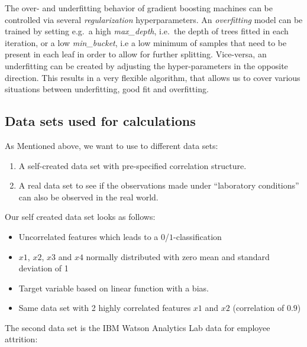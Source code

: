 \documentclass[]{krantz}
\providecommand{\tightlist}{%
  \setlength{\itemsep}{0pt}\setlength{\parskip}{0pt}}
\begin{document}
The over- and underfitting behavior of gradient boosting machines can be
controlled via several \emph{regularization} hyperparameters. An
\emph{overfitting} model can be trained by setting e.g.~a high
\emph{max\_depth}, i.e.~the depth of trees fitted in each iteration, or
a low \emph{min\_bucket}, i.e a low minimum of samples that need to be
present in each leaf in order to allow for further splitting.
Vice-versa, an underfitting can be created by adjusting the
hyper-parameters in the opposite direction. This results in a very
flexible algorithm, that allows us to cover various situations between
underfitting, good fit and overfitting.

\subsection{Data sets used for
calculations}\label{data-sets-used-for-calculations}

As Mentioned above, we want to use to different data sets:

\begin{enumerate}
\def\labelenumi{\arabic{enumi}.}
\item
  A self-created data set with pre-specified correlation structure.
\item
  A real data set to see if the observations made under ``laboratory
  conditions'' can also be observed in the real world.
\end{enumerate}

Our self created data set looks as follows:

\begin{itemize}
\tightlist
\item
  Uncorrelated features which leads to a \(0\)/\(1\)-classification
\item
  \(x1\), \(x2\), \(x3\) and \(x4\) normally distributed with zero mean
  and standard deviation of 1
\item
  Target variable based on linear function with a bias.
\item
  Same data set with 2 highly correlated features \(x1\) and \(x2\)
  (correlation of \(0.9\))
\end{itemize}

The second data set is the IBM Watson Analytics Lab data for employee
attrition:
\end{document}
